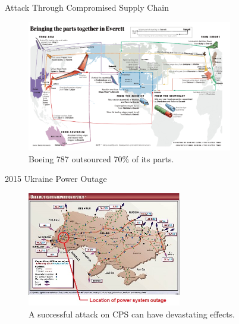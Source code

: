 \documentclass[10pt]{beamer}
\begin{document}
\begin{frame}{Attack Through Compromised Supply Chain}
  \begin{figure}[ht]
    \centering
    \includegraphics[width=0.8\textwidth]{boeing.jpg}
    \caption{Boeing 787 outsourced 70\% of its parts.}
  \end{figure}
\end{frame}

\begin{frame}{2015 Ukraine Power Outage}
  \begin{figure}[<+htpb+>]
    \begin{center}
      \includegraphics[width=0.60\textwidth]{ukraine.jpg}
      \caption{A successful attack on CPS can have devastating effects.}
    \end{center}
  \end{figure}
\end{frame}

%
\end{document}
